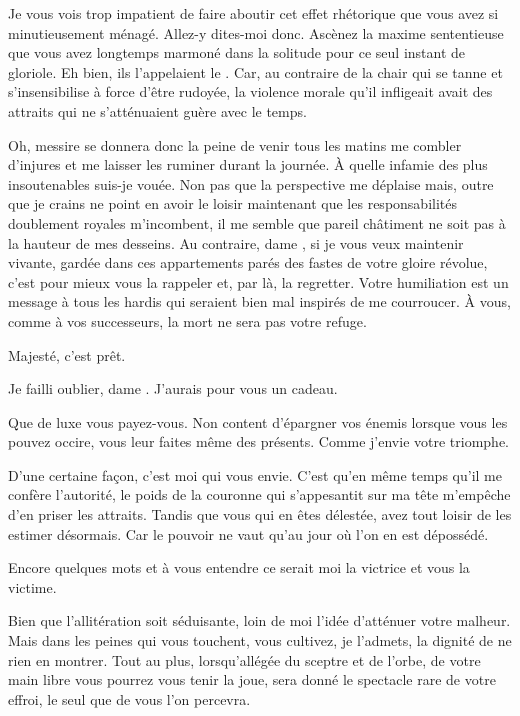 \begin{drama}
  \reinespeaks Je vous vois trop impatient de faire aboutir cet effet rhétorique que vous avez si minutieusement ménagé. Allez-y dites-moi donc. Ascènez la maxime sententieuse que vous avez longtemps marmoné dans la solitude pour ce seul instant de gloriole.
  \elenaspeaks Eh bien, ils l’appelaient le . Car, au contraire de la chair qui se tanne et s’insensibilise à force d’être rudoyée, la violence morale qu’il infligeait avait des attraits qui ne s’atténuaient guère avec le temps.

  \reinespeaks Oh, messire se donnera donc la peine de venir tous les matins me combler d’injures et me laisser les ruminer durant la journée. À quelle infamie des plus insoutenables suis-je vouée.
  \elenaspeaks {} Non pas que la perspective me déplaise mais, outre que je crains ne point en avoir le loisir maintenant que les responsabilités doublement royales m’incombent, il me semble que pareil châtiment ne soit pas à la hauteur de mes desseins. Au contraire, dame \reine, si je vous veux maintenir vivante, gardée dans ces appartements parés des fastes de votre gloire révolue, c’est pour mieux vous la rappeler et, par là, la regretter. Votre humiliation est un message à tous les hardis qui seraient bien mal inspirés de me courroucer. À vous, comme à vos successeurs, la mort ne sera pas votre refuge.

  \intrat{\disciple}

  \disciplespeaks Majesté, c’est prêt.

  \elenaspeaks Je failli oublier, dame \reine. J’aurais pour vous un cadeau.

  \reinespeaks Que de luxe vous payez-vous. Non content d’épargner vos énemis lorsque vous les pouvez occire, vous leur faites même des présents. Comme j’envie votre triomphe.

  \elenaspeaks D’une certaine façon, c’est moi qui vous envie. C’est qu’en même temps qu’il me confère l’autorité, le poids de la couronne qui s’appesantit sur ma tête m’empêche d’en priser les attraits. Tandis que vous qui en êtes délestée, avez tout loisir de les estimer désormais. Car le pouvoir ne vaut qu’au jour où l’on en est dépossédé.

  \reinespeaks Encore quelques mots et à vous entendre ce serait moi la victrice et vous la victime.

  \elenaspeaks Bien que l’allitération soit séduisante, loin de moi l’idée d’atténuer votre malheur. Mais dans les peines qui vous touchent, vous cultivez, je l’admets, la dignité de ne rien en montrer. Tout au plus, lorsqu’allégée du sceptre et de l’orbe, de votre main libre vous pourrez vous tenir la joue, sera donné le spectacle rare de votre effroi, le seul que de vous l’on percevra.


\end{drama}
